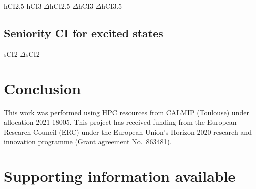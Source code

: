 \documentclass[aip,jcp,reprint,noshowkeys,superscriptaddress]{revtex4-1}
\begin{document}
hCI2.5
hCI3
$\Delta$hCI2.5
$\Delta$hCI3
$\Delta$hCI3.5


\subsection{Seniority CI for excited states}
\label{sec:res_C}

sCI2
$\Delta$sCI2


\section{Conclusion}
\label{sec:ccl}

\begin{acknowledgements}
This work was performed using HPC resources from CALMIP (Toulouse) under allocation 2021-18005.
This project has received funding from the European Research Council (ERC) under the European Union's Horizon 2020 research and innovation programme (Grant agreement No.~863481).
\end{acknowledgements}

\section*{Supporting information available}
\label{sec:SI}



\end{document}
